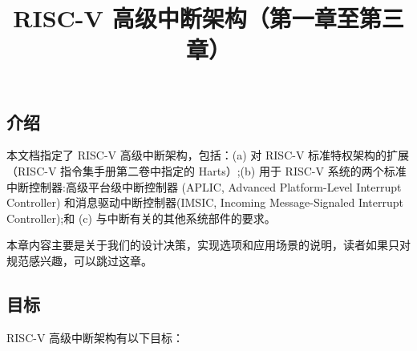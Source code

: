 \begin{translation}
\newcommand{\instbit}[1]{\mbox{\scriptsize #1}}
\newcommand{\instbitrange}[2]{~\instbit{#1} \hfill \instbit{#2}~}
\newcommand{\reglabel}[1]{\hfill {\tt #1}\hfill\ }


\newcommand{\z}[1]{{\tt\catcode`\`=\active\protect\frenchspacing#1}}
\newcommand{\zSafe}[1]{{\tt #1}}
\newcommand{\LB}{\char123}
\newcommand{\RB}{\char125}
\newcommand{\RISCV}{RISC-V}

\newcommand{\WIRI}{\textbf{WIRI}}
\newcommand{\WPRI}{\textbf{WPRI}}
\newcommand{\WLRL}{\textbf{WLRL}}
\newcommand{\WARL}{\textbf{WARL}}

\newcommand{\unspecified}{\textsc{unspecified}}

\title{RISC-V 高级中断架构（第一章至第三章）}
\maketitle

\tableofcontents

\section{介绍}
\label{ch:intro}

本文档指定了 {\RISCV} 高级中断架构，包括：(a) 对 {\RISCV} 标准特权架构的扩展（{\RISCV} 指令集手册第二卷中指定的 Harts）;(b) 用于 {\RISCV} 系统的两个标准中断控制器:高级平台级中断控制器 (APLIC, Advanced Platform-Level Interrupt Controller) 和消息驱动中断控制器(IMSIC, Incoming Message-Signaled Interrupt Controller);和 (c) 与中断有关的其他系统部件的要求。

\begin{commentary}
    本章内容主要是关于我们的设计决策，实现选项和应用场景的说明，读者如果只对规范感兴趣，可以跳过这章。
\end{commentary}

\subsection{目标}

{\RISCV} 高级中断架构有以下目标：
\begin{itemize}


\end{itemize}
\end{translation}

